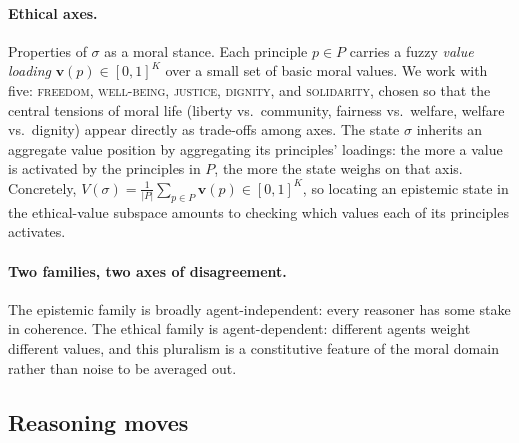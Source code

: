 \documentclass{article}
\begin{document}
\paragraph{Ethical axes.} Properties of $\sigma$ as a moral stance. Each
principle $p \in P$ carries a fuzzy \emph{value loading} $\boldsymbol{v}(p)
\in [0, 1]^K$ over a small set of basic moral values. We work with five:
\textsc{freedom}, \textsc{well-being}, \textsc{justice}, \textsc{dignity},
and \textsc{solidarity}, chosen so that the central tensions of moral life
(liberty vs.\ community, fairness vs.\ welfare, welfare vs.\ dignity) appear
directly as trade-offs among axes. The state $\sigma$ inherits an aggregate
value position by aggregating its principles' loadings: the more a value is
activated by the principles in $P$, the more the state weighs on that axis.
Concretely, $V(\sigma) = \tfrac{1}{|P|} \sum_{p \in P} \boldsymbol{v}(p)
\in [0, 1]^K$, so locating an epistemic state in the ethical-value subspace
amounts to checking which values each of its principles activates.

\paragraph{Two families, two axes of disagreement.} The epistemic family is
broadly agent-independent: every reasoner has some stake in coherence. The
ethical family is agent-dependent: different agents weight different values,
and this pluralism is a constitutive feature of the moral domain rather than
noise to be averaged out.

\subsection{Reasoning moves}
\label{sec:moves}
\end{document}
